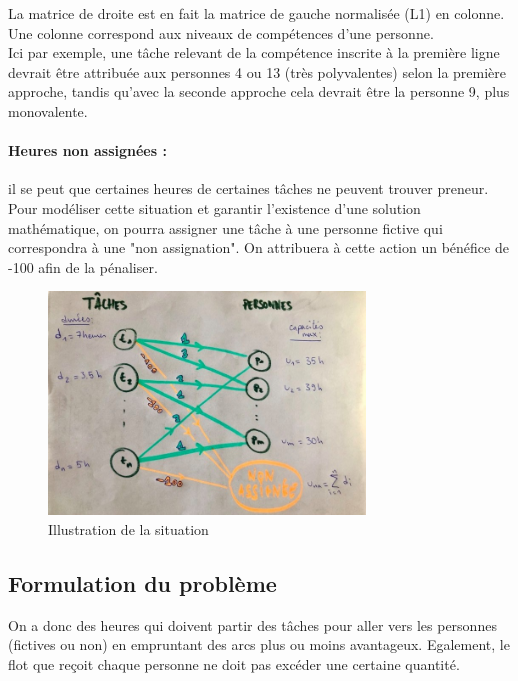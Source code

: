 \documentclass[12pt]{article}
\begin{document}
La matrice de droite est en fait la matrice de gauche normalisée (L1) en colonne.
Une colonne correspond aux niveaux de compétences d'une personne.\\
Ici par exemple, une tâche relevant de la compétence inscrite à la première ligne devrait être attribuée aux personnes 4 ou 13 (très polyvalentes) selon la première approche, tandis qu'avec la seconde approche cela devrait être la personne 9, plus monovalente.

\paragraph{Heures non assignées :}
il se peut que certaines heures de certaines tâches ne peuvent trouver preneur. Pour modéliser cette situation et garantir l'existence d'une solution mathématique, on pourra assigner une tâche à une personne fictive qui correspondra à une "non assignation". On attribuera à cette action un bénéfice de -100 afin de la pénaliser.





\begin{figure}[H]
\caption{Illustration de la situation}
\begin{center}
\includegraphics[width=0.75\textwidth]{graphe}
\end{center}
\end{figure}
\newpage



\subsection{Formulation du problème}
On a donc des heures qui doivent partir des tâches pour aller vers les personnes (fictives ou non) en empruntant des arcs plus ou moins avantageux. Egalement, le flot que reçoit chaque personne ne doit pas excéder une certaine quantité.
\end{document}
